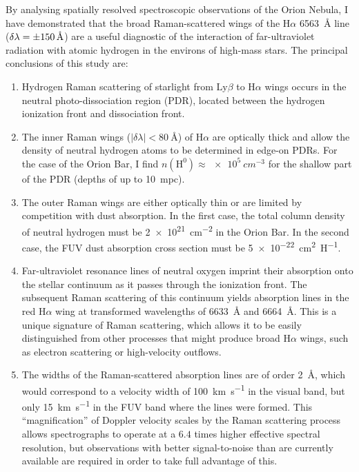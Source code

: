 \documentclass[useAMS, usenatbib, a4paper]{mnras}
\newcounter{ionstage}
\renewcommand{\ion}[2]{\setcounter{ionstage}{#2}%
  \ensuremath{\mathrm{#1\,\scriptstyle\Roman{ionstage}}}}
\def\th#1#2{\ensuremath{\theta^{#1}\,\text{Ori~#2}}}
\newcommand*\chem[1]{\ensuremath{\mathrm{#1}}}
\newcommand\ha{\ensuremath{\text{H}\alpha}}
\newcommand\lyb{\ensuremath{\text{Ly}\beta}}
\begin{document}
By analysing spatially resolved spectroscopic observations  of the Orion Nebula,
I have demonstrated that the broad Raman-scattered wings
of the \ha{} \SI{6563}{\angstrom} line
(\(\delta \lambda = \SI{\pm 150}{\angstrom}\))
are a useful diagnostic of the interaction of far-ultraviolet radiation with
atomic hydrogen in the environs of high-mass stars.
The principal conclusions of this study are:
\begin{enumerate}[1.]
\item Hydrogen Raman scattering of starlight from \lyb{} to \ha{} wings
  occurs in the neutral photo-dissociation region (PDR),
  located between the hydrogen ionization front and dissociation front.  
\item The inner Raman wings (\(|\delta \lambda | < \SI{80}{\angstrom}\)) of \ha{}
  are optically thick and allow
  the density of neutral hydrogen atoms to be determined in edge-on PDRs.
  For the case of the Orion Bar, I find \(n(\chem{H^0}) \approx \SI{e5}{cm^{-3}}\)
  for the shallow part of the PDR (depths of up to \SI{10}{mpc}).
\item The outer Raman wings are either optically thin or are limited by
  competition with dust absorption.
  In the first case, the total column density of neutral hydrogen must be 
  \SI{2e21}{cm^{-2}} in the Orion Bar.
  In the second case, the FUV dust absorption cross section must be
  \SI{5e-22}{cm^{2}.H^{-1}}.
\item Far-ultraviolet resonance lines of neutral oxygen imprint their absorption
  onto the stellar continuum as it passes through the ionization front.
  The subsequent Raman scattering of this continuum yields absorption lines
  in the red \ha{} wing
  at transformed wavelengths of \SI{6633}{\angstrom} and \SI{6664}{\angstrom}.
  This is a unique signature of Raman scattering, which allows it
  to be easily distinguished from other processes that might produce broad \ha{} wings,
  such as electron scattering or high-velocity outflows.
\item
  The widths of the Raman-scattered absorption lines are of order \SI{2}{\angstrom},
  which would correspond to a velocity width of \SI{100}{km.s^{-1}} in the visual band,
  but only \SI{15}{km.s^{-1}} in the FUV band where the lines were formed.
  This ``magnification'' of Doppler velocity scales by the Raman scattering process
  allows spectrographs to operate at a \(6.4\) times higher effective spectral resolution,
  but observations with better signal-to-noise 
  than are currently available are required in order to take full advantage of this.
\end{enumerate}
\end{document}
